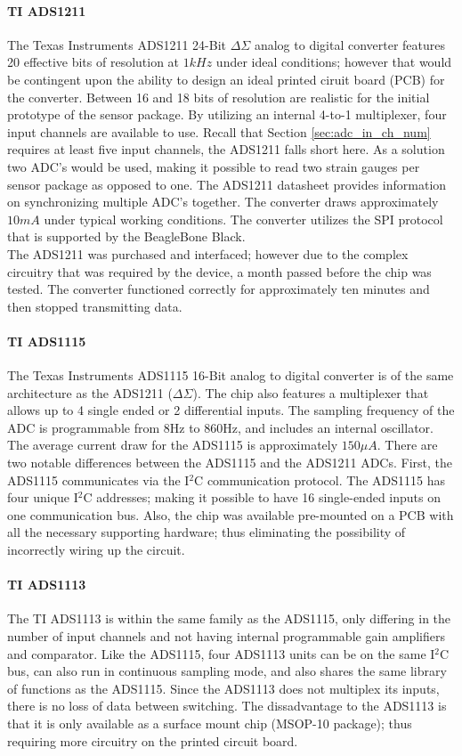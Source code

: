 \paragraph{TI ADS1211}
\label{sec:ADC_ADS1211}
\indent The Texas Instruments ADS1211 24-Bit $\Delta \Sigma$ analog to digital converter features 20 effective bits of resolution at $1kHz$ under ideal
conditions; however that would be contingent upon the ability to design an ideal printed ciruit board (PCB) for the converter. Between 16 and 18 bits of
resolution are realistic for the initial prototype of the sensor package. By utilizing an internal 4-to-1 multiplexer, four input channels are available
to use. Recall that Section \ref{sec:adc_in_ch_num} requires at least five input channels, the ADS1211 falls short here. As a solution two ADC's would
be used, making it possible to read two strain gauges per sensor package as opposed to one. The ADS1211 datasheet provides information on synchronizing
multiple ADC's together. The converter draws approximately $10mA$ under typical working conditions. The converter utilizes the SPI protocol that is
supported by the BeagleBone Black.\\
\indent The ADS1211 was purchased and interfaced; however due to the complex circuitry that was required by the device, a month passed before the chip was
tested. The converter functioned correctly for approximately ten minutes and then stopped transmitting data. 
\paragraph{TI ADS1115}
\label{sec:ADC_ADS1115}
\indent The Texas Instruments ADS1115 16-Bit analog to digital converter is of the same architecture as the ADS1211 ($\Delta \Sigma$). The chip also
features a multiplexer that allows up to 4 single ended or 2 differential inputs. The sampling frequency of the ADC is programmable from 8Hz to 860Hz, and
includes an internal oscillator. The average current draw for the ADS1115 is approximately $150\mu A$. There are two notable differences between the
ADS1115 and the ADS1211 ADCs. First, the ADS1115 communicates via the I$^{2}$C communication protocol. The ADS1115 has four unique I$^{2}$C addresses;
making it possible to have 16 single-ended inputs on one communication bus. Also, the chip was available pre-mounted on a PCB with all the necessary
supporting hardware; thus eliminating the possibility of incorrectly wiring up the circuit. 
\paragraph{TI ADS1113}
\label{sec:ADC_ADS1113}
\indent The TI ADS1113 is within the same family as the ADS1115, only differing in the number of input channels and not having internal programmable gain amplifiers and comparator.
Like the ADS1115, four ADS1113 units can be on the same I$^{2}$C bus, can also run in continuous sampling mode, and also shares the same library of functions as the ADS1115.
Since the ADS1113 does not multiplex its inputs, there is no loss of data between switching.
The dissadvantage to the ADS1113 is that it is only available as a surface mount chip (MSOP-10 package); thus requiring more circuitry on the printed circuit board.

